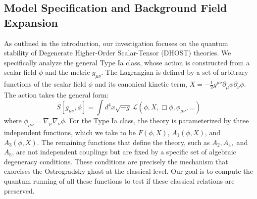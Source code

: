 \documentclass[twocolumn]{aastex631}
\begin{document}
\subsection{Model Specification and Background Field Expansion}

As outlined in the introduction, our investigation focuses on the quantum stability of Degenerate Higher-Order Scalar-Tensor (DHOST) theories. We specifically analyze the general Type Ia class, whose action is constructed from a scalar field $\phi$ and the metric $g_{\mu\nu}$. The Lagrangian is defined by a set of arbitrary functions of the scalar field $\phi$ and its canonical kinetic term, $X = - \frac{1}{2} g^{\mu\nu} \partial_\mu\phi \partial_\nu\phi$. The action takes the general form:
\begin{equation}
    S[g_{\mu\nu}, \phi] = \int d^4x \sqrt{-g} \, \mathcal{L}(\phi, X, \Box\phi, \phi_{\mu\nu}, \dots)
\end{equation}
where $\phi_{\mu\nu} = \nabla_\mu \nabla_\nu \phi$. For the Type Ia class, the theory is parameterized by three independent functions, which we take to be $F(\phi, X)$, $A_1(\phi, X)$, and $A_3(\phi, X)$. The remaining functions that define the theory, such as $A_2, A_4,$ and $A_5$, are not independent couplings but are fixed by a specific set of algebraic degeneracy conditions. These conditions are precisely the mechanism that exorcises the Ostrogradsky ghost at the classical level. Our goal is to compute the quantum running of all these functions to test if these classical relations are preserved.
\end{document}
